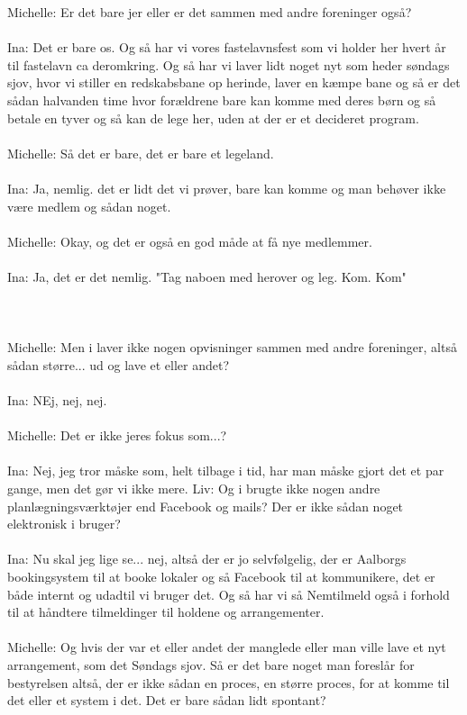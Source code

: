 Michelle: Er det bare jer eller er det sammen med andre foreninger også?
\\\\
Ina: Det er bare os. Og så har vi vores fastelavnsfest som vi holder her hvert år til fastelavn ca deromkring. Og så har vi laver lidt noget nyt som heder søndags sjov, hvor vi stiller en redskabsbane op herinde, laver en kæmpe bane og så er det sådan halvanden time hvor forældrene bare kan komme med deres børn og så betale en tyver og så kan de lege her, uden at  der er et decideret program. 
\\\\
Michelle: Så det er bare, det er bare et legeland.
\\\\
Ina: Ja, nemlig. det er lidt det vi prøver, bare kan komme og man behøver ikke være medlem og sådan noget. \\\\
Michelle: Okay, og det er også en god måde at få nye medlemmer.
\\\\
Ina: Ja, det er det nemlig. "Tag naboen med herover og leg. Kom. Kom"
\\\\
[Lidt utydelig snakken frem og tilbage]
\\\\
Michelle: Men i laver ikke nogen opvisninger sammen med andre foreninger, altså sådan større... ud og lave et eller andet?
\\\\
Ina: NEj, nej, nej.
\\\\
Michelle: Det er ikke jeres fokus som...?
\\\\
Ina: Nej, jeg tror måske som, helt tilbage i tid, har man måske gjort det et par gange, men det gør vi ikke mere.
Liv: Og i brugte ikke nogen  andre planlægningsværktøjer end Facebook og mails? Der er ikke sådan noget elektronisk i bruger?
\\\\
Ina: Nu skal jeg lige se... nej, altså der er jo selvfølgelig, der er Aalborgs bookingsystem til at booke lokaler og så Facebook til at kommunikere, det er både internt og udadtil vi bruger det. Og så har vi så Nemtilmeld også i forhold til at håndtere tilmeldinger til holdene og arrangementer. 
\\\\
Michelle: Og hvis der var et eller andet der manglede eller man ville lave et nyt arrangement, som det Søndags sjov. Så er det bare noget man foreslår for bestyrelsen altså, der er ikke sådan en proces, en større proces, for at komme til det eller et system i det. Det er bare sådan lidt spontant?
